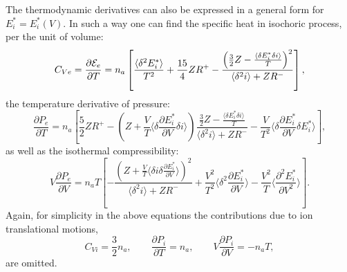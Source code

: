 The thermodynamic derivatives can also be expressed in a general form for $E^*_i=E^*_i(V)$.
In such a way one can find the specific heat in isochoric process, per the unit of volume:
\begin{equation}\label{generalCv}
C_{Ve}=\frac{\partial {\cal E}_e}{\partial T}=n_a\left[\frac{\langle\delta^2 E^*_i \rangle}{T^2}+\frac{15}4ZR^+
-\frac{\left(\frac32Z-\frac{\langle\delta E^*_i \delta i\rangle}T\right)^2}{\langle\delta^2i\rangle+ZR^-}\right],
\end{equation}
the temperature derivative of pressure:
\begin{equation}\label{generalPT}
\frac {\partial P_e}{\partial T}=
n_a\left[
	\frac52 Z R^+ -
	\left( Z+\frac{V}{T} \langle \delta \frac{\partial E^*_i}{\partial V} \delta i \rangle \right)
		\frac{\frac32Z-\frac{\langle\delta E^*_i \delta i\rangle}T}{\langle\delta^2i\rangle+ZR^-} -
	\frac{V}{T^2} \langle \delta \frac{\partial E^*_i}{\partial V} \delta E^*_i \rangle
\right],
\end{equation}
as well as the isothermal compressibility:
\begin{equation}\label{generalCompr}
V\frac{\partial P_e}{\partial V}=
n_a T \left[ -\frac{\left(Z + \frac{V}{T} \langle \delta i \delta \frac{\partial E^*_i}{\partial V} \rangle \right)^2}
{\langle \delta^2 i \rangle + ZR^-} +
\frac{V^2}{T^2} \langle \delta^2 \frac{\partial E^*_i}{\partial V} \rangle -
\frac{V^2}{T} \langle \frac{\partial^2 E^*_i}{\partial V^2} \rangle
\right].
\end{equation}
Again, for simplicity in the above equations the contributions due to ion translational motions,
\begin{equation}
C_{Vi}=\frac32n_a, \qquad
\frac{\partial P_i}{\partial T}=n_a, \qquad
V\frac{\partial P_i}{\partial V}=-n_aT,
\end{equation}
are omitted.

